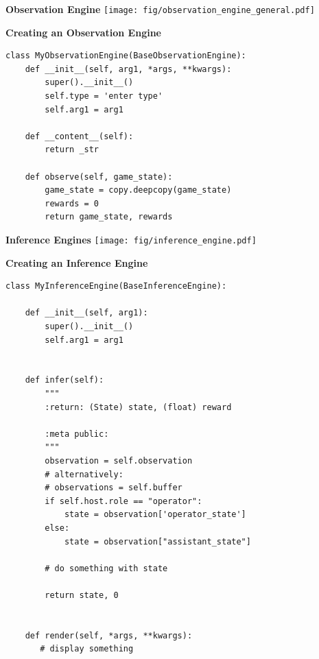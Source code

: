 \documentclass[11pt, xcolor = {dvipsnames}]{beamer}
\begin{document}
\begin{frame}{\textbf{Observation Engine}}
\centering
\texttt{[image: fig/observation\_engine\_general.pdf]} 
\end{frame}

\begin{frame}[fragile]{\textbf{Creating an Observation Engine}}
\begin{adjustbox}{height=.4\textheight}\lstset{language=Python}
\lstset{frame=lines}
\lstset{basicstyle=\footnotesize}
\begin{lstlisting}
class MyObservationEngine(BaseObservationEngine):
    def __init__(self, arg1, *args, **kwargs):
        super().__init__()
        self.type = 'enter type'
        self.arg1 = arg1

    def __content__(self):
        return _str

    def observe(self, game_state):
        game_state = copy.deepcopy(game_state)
        rewards = 0
        return game_state, rewards
\end{lstlisting}
\end{adjustbox}
\end{frame}

\begin{frame}{\textbf{Inference Engines}}
\centering
\texttt{[image: fig/inference\_engine.pdf]} 
\end{frame}


\begin{frame}[fragile]{\textbf{Creating an Inference Engine}}
\begin{adjustbox}{height=.4\textheight}\lstset{language=Python}
\lstset{frame=lines}
\lstset{basicstyle=\footnotesize}
\begin{lstlisting}
class MyInferenceEngine(BaseInferenceEngine):
    
    def __init__(self, arg1):
        super().__init__()
        self.arg1 = arg1


    def infer(self):
        """
        :return: (State) state, (float) reward

        :meta public:
        """
        observation = self.observation
        # alternatively:
        # observations = self.buffer
        if self.host.role == "operator":
            state = observation['operator_state']
        else:
            state = observation["assistant_state"]

        # do something with state

        return state, 0


    def render(self, *args, **kwargs):
       # display something
\end{lstlisting}
\end{adjustbox}
\end{frame}
\end{document}
